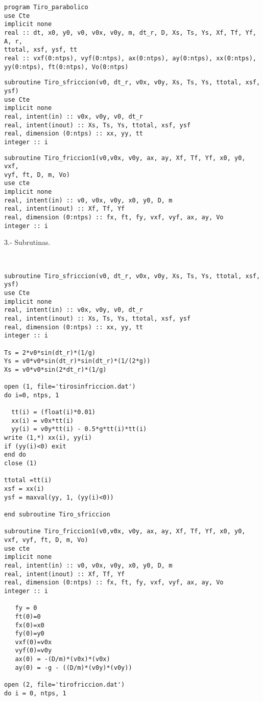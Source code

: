 \documentclass[12pt]{article}
\begin{document}
\begin{verbatim}
program Tiro_parabolico
use Cte
implicit none 
real :: dt, x0, y0, v0, v0x, v0y, m, dt_r, D, Xs, Ts, Ys, Xf, Tf, Yf, A, r, 
ttotal, xsf, ysf, tt
real :: vxf(0:ntps), vyf(0:ntps), ax(0:ntps), ay(0:ntps), xx(0:ntps), 
yy(0:ntps), ft(0:ntps), Vo(0:ntps)
\end{verbatim} 

\begin{verbatim}
subroutine Tiro_sfriccion(v0, dt_r, v0x, v0y, Xs, Ts, Ys, ttotal, xsf, ysf)
use Cte
implicit none
real, intent(in) :: v0x, v0y, v0, dt_r
real, intent(inout) :: Xs, Ts, Ys, ttotal, xsf, ysf
real, dimension (0:ntps) :: xx, yy, tt
integer :: i
\end{verbatim}

\begin{verbatim}
subroutine Tiro_friccion1(v0,v0x, v0y, ax, ay, Xf, Tf, Yf, x0, y0, vxf,
vyf, ft, D, m, Vo) 
use cte
implicit none
real, intent(in) :: v0, v0x, v0y, x0, y0, D, m
real, intent(inout) :: Xf, Tf, Yf
real, dimension (0:ntps) :: fx, ft, fy, vxf, vyf, ax, ay, Vo
integer :: i
\end{verbatim}

\begin{large}
3.- Subrutinas.
\end{large}\\

\begin{verbatim}
subroutine Tiro_sfriccion(v0, dt_r, v0x, v0y, Xs, Ts, Ys, ttotal, xsf, ysf)
use Cte
implicit none
real, intent(in) :: v0x, v0y, v0, dt_r
real, intent(inout) :: Xs, Ts, Ys, ttotal, xsf, ysf
real, dimension (0:ntps) :: xx, yy, tt
integer :: i

Ts = 2*v0*sin(dt_r)*(1/g)
Ys = v0*v0*sin(dt_r)*sin(dt_r)*(1/(2*g))
Xs = v0*v0*sin(2*dt_r)*(1/g)

open (1, file='tirosinfriccion.dat')
do i=0, ntps, 1
  
  tt(i) = (float(i)*0.01)
  xx(i) = v0x*tt(i) 
  yy(i) = v0y*tt(i) - 0.5*g*tt(i)*tt(i)
write (1,*) xx(i), yy(i)
if (yy(i)<0) exit
end do
close (1)

ttotal =tt(i)
xsf = xx(i)
ysf = maxval(yy, 1, (yy(i)<0))

end subroutine Tiro_sfriccion

subroutine Tiro_friccion1(v0,v0x, v0y, ax, ay, Xf, Tf, Yf, x0, y0, vxf, vyf, ft, D, m, Vo) 
use cte
implicit none
real, intent(in) :: v0, v0x, v0y, x0, y0, D, m
real, intent(inout) :: Xf, Tf, Yf
real, dimension (0:ntps) :: fx, ft, fy, vxf, vyf, ax, ay, Vo
integer :: i
   
   fy = 0
   ft(0)=0
   fx(0)=x0
   fy(0)=y0
   vxf(0)=v0x
   vyf(0)=v0y
   ax(0) = -(D/m)*(v0x)*(v0x)
   ay(0) = -g - ((D/m)*(v0y)*(v0y))

open (2, file='tirofriccion.dat')  
do i = 0, ntps, 1
\end{verbatim}
\end{document}
